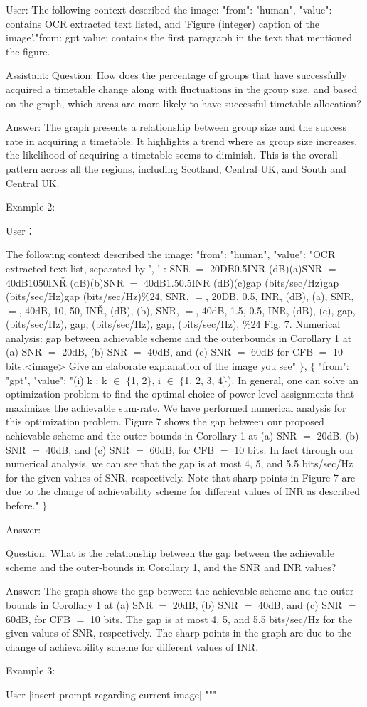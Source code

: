 \documentclass{article}
\begin{document}
 User: The following context described the image:  "from": "human", "value": contains OCR extracted text listed, and 'Figure (integer) caption of the image'."from: gpt value: contains the first paragraph in the text that mentioned the figure.

 Assistant: Question: How does the percentage of groups that have successfully acquired a timetable change along with fluctuations in the group size, and based on the graph, which areas are more likely to have successful timetable allocation?

 Answer: The graph presents a relationship between group size and the success rate in acquiring a timetable. It highlights a trend where as group size increases, the likelihood of acquiring a timetable seems to diminish. This is the overall pattern across all the regions, including Scotland, Central UK, and South and Central UK.

 Example 2:

 User：

The following context described the image: "from": "human", "value": "OCR extracted text list, separated by ', ' : SNR $=$ 20DB0.5INR (dB)(a)SNR $=$ 40dB1050INŘ (dB)(b)SNR $=$ 40dB1.50.5INR (dB)(c)gap (bits/sec/Hz)gap (bits/sec/Hz)gap (bits/sec/Hz)$\%$24, SNR, $=$, 20DB, 0.5, INR, (dB), (a), SNR, $=$, 40dB, 10, 50, INŘ, (dB), (b), SNR, $=$, 40dB, 1.5, 0.5, INR, (dB), (c), gap, (bits/sec/Hz), gap, (bits/sec/Hz), gap, (bits/sec/Hz), $\%$24 Fig. 7. Numerical analysis: gap between achievable scheme and the outerbounds in Corollary 1 at (a) SNR $=$ 20dB, (b) SNR $=$ 40dB, and (c) SNR $=$ 60dB for CFB $=$ 10 bits.<image> Give an elaborate explanation of the image you see" $\}$, $\{$ "from": "gpt", "value": "(i) k : k $\in$ $\{$1, 2$\}$, i $\in$ $\{$1, 2, 3, 4$\}$). In general, one can solve an optimization problem to find the optimal choice of power level assignments that maximizes the achievable sum-rate. We have performed numerical analysis for this optimization problem. Figure 7 shows the gap between our proposed achievable scheme and the outer-bounds in Corollary 1 at (a) SNR $=$ 20dB, (b) SNR $=$ 40dB, and (c) SNR $=$ 60dB, for CFB $=$ 10 bits. In fact through our numerical analysis, we can see that the gap is at most 4, 5, and 5.5 bits/sec/Hz for the given values of SNR, respectively. Note that sharp points in Figure 7 are due to the change of achievability scheme for different values of INR as described before." $\}$

 Answer:

 Question: What is the relationship between the gap between the achievable scheme and the outer-bounds in Corollary 1, and the SNR and INR values?

 Answer: The graph shows the gap between the achievable scheme and the outer-bounds in Corollary 1 at (a) SNR $=$ 20dB, (b) SNR $=$ 40dB, and (c) SNR $=$ 60dB, for CFB $=$ 10 bits. The gap is at most 4, 5, and 5.5 bits/sec/Hz for the given values of SNR, respectively. The sharp points in the graph are due to the change of achievability scheme for different values of INR.

 Example 3:

 User [insert prompt regarding current image]
"""
\end{document}
